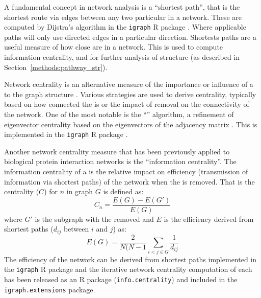 A fundamental concept in network analysis is a ``\gls{shortest path}'', that is the shortest route via \glspl{edge} between any two particular  in a network. These are computed by Dijstra's algorithm \citep{Dijkstra1959} in the \texttt{igraph} R package \citep{igraph}. Where applicable paths will only use directed \glspl{edge} in a particular direction. Shortests paths are a useful measure of how close  are in a network. This is used to compute \gls{information centrality}, and for further analysis of  structure (as described in Section~\ref{methods:pathway_str}).

Network \gls{centrality} is an alternative measure of the importance or influence of a  to the \gls{graph} structure \citep{Borgatti2005}. Various strategies are used to derive centrality,  typically based on how connected the  is or the impact of  removal on the connectivity of the network. One of the most notable is the ``'' algorithm, a refinement of eigenvector \gls{centrality} based on the eigenvectors of the adjacency matrix \citep{Brin1998}. This is implemented in the \texttt{igraph} R package \citep{igraph}.

Another network \gls{centrality} measure that has been previously applied to biological protein interaction networks \citep{Kranthi2013} is the ``\gls{information centrality}''. The \gls{information centrality} of a  is the relative impact on efficiency (transmission of information via \glspl{shortest path}) of the network when the  is removed. That is the \gls{centrality} ($C$) \citep{Kranthi2013} for  $n$ in graph $G$ is defined as: $$C_n = \frac{E(G)-E(G')}{E(G)}$$ where $G'$ is the subgraph with the  removed and $E$ is the efficiency \citep{Latora2001} derived from \glspl{shortest path} ($d_{ij}$ between  $i$ and $j$) as: $$E(G) = \frac{2}{N(N-1} \sum_{i<j \in G}^{} \frac{1}{d_{ij}}$$ The efficiency of the network can be derived from \glspl{shortest path} implemented in the \texttt{igraph} R package and the iterative network \gls{centrality} computation of each  has been released as an R package (\texttt{info.centrality}) and included in the \texttt{igraph.extensions} package.

